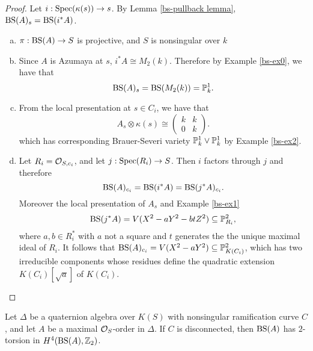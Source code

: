 \begin{proof} Let $i: \textnormal{Spec}(\kappa(s))\rightarrow s$.  By Lemma \ref{bs-pullback lemma}, $\textnormal{BS}(A)_s = \textnormal{BS}(i^*A)$.
\begin{enumerate}[(a)]
\item  $\pi: \textnormal{BS}(A)\rightarrow S$ is projective, and $S$ is nonsingular over $k$
\item  Since $A$ is Azumaya at $s$, $i^*A\cong M_2(k)$.  Therefore by Example \ref{bs-ex0}, we have that
$$\textnormal{BS}(A)_s = \textnormal{BS}(M_2(k)) = \mathbb{P}^1_k.$$
\item
From the local presentation at $s\in C_i$, we have that
$$A_s\otimes\kappa(s) \cong\left(\begin{array}{cc}
k & k\\
0 & k
\end{array}\right).$$
which has corresponding Brauer-Severi variety $\mathbb{P}^1_k\vee\mathbb{P}^1_k$ by Example \ref{bs-ex2}.
\item
Let $R_i = \mathcal{O}_{S,c_i}$, and let $j: \textnormal{Spec}(R_i)\rightarrow S$.  Then $i$ factors through $j$ and therefore
$$\textnormal{BS}(A)_{c_i} = \textnormal{BS}(i^*A) = \textnormal{BS}(j^*A)_{c_i}.$$
Moreover the local presentation of $A_s$ and Example \ref{bs-ex1}
$$\textnormal{BS}(j^*A) = V(X^2 - aY^2 - btZ^2)\subseteq \mathbb{P}^2_{R_i},$$
where $a,b\in R_i^*$ with $a$ not a square and $t$ generates the the unique maximal ideal of $R_i$.  It follows that $\textnormal{BS}(A)_{c_i} = V(X^2-aY^2)\subseteq \mathbb{P}^2_{K(C_i)}$, which has two irreducible components whose residues define the quadratic extension $K(C_i)[\sqrt{a}]$ of $K(C_i)$.
\end{enumerate}
\end{proof}

\begin{prop}
Let $\Delta$ be a quaternion algebra over $K(S)$ with nonsingular ramification curve $C$, and let $A$ be a maximal $\mathcal{O}_S$-order in $\Delta$.  If $C$ is disconnected, then $\textnormal{BS}(A)$ has $2$-torsion in $H^4(\textnormal{BS}(A),\mathbb{Z}_2)$.
\end{prop}


